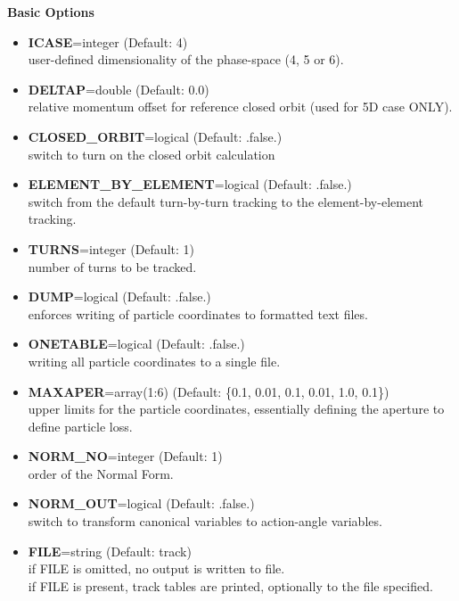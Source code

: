 {\bf Basic Options}\\
\begin{itemize}
   \item {\bf ICASE}=integer (Default: 4)\\ 
     user-defined dimensionality of the phase-space (4, 5 or 6). 

   \item {\bf DELTAP}=double (Default: 0.0)\\
     relative momentum offset for reference closed orbit (used for 5D
     case ONLY). 

   \item {\bf CLOSED\_ORBIT}=logical (Default: .false.)\\
     switch to turn on the closed orbit calculation
     
   \item {\bf ELEMENT\_BY\_ELEMENT}=logical (Default: .false.)\\
     switch from the default turn-by-turn tracking to the
     element-by-element tracking. 

   \item {\bf TURNS}=integer (Default: 1)\\
     number of turns to be tracked.

   \item {\bf DUMP}=logical (Default: .false.)\\ 
     enforces writing of particle coordinates to formatted text files.

   \item {\bf ONETABLE}=logical (Default: .false.)\\ 
     writing all particle coordinates to a single file.

   \item {\bf MAXAPER}=array(1:6) (Default: \{0.1, 0.01, 0.1, 0.01, 1.0, 0.1\})\\
     upper limits for the particle coordinates, essentially defining the
     aperture to define particle loss. 
     
   \item {\bf NORM\_NO}=integer (Default: 1)\\ 
     order of the Normal Form. 

   \item {\bf NORM\_OUT}=logical (Default: .false.) \\
     switch to transform canonical variables to action-angle variables.

   \item {\bf FILE}=string (Default: track)\\ 
     if FILE is omitted, no output is written to file.\\
     if FILE is present, track tables are printed, optionally to the file specified.


\end{itemize}
